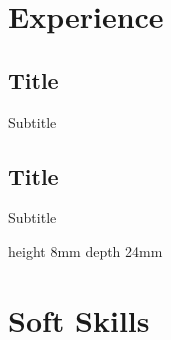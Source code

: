 \documentclass{CVClass}
\begin{document}
\begin{minipage}[t]{0.60\textwidth}
    \section{Experience}
    \subsection[2019-2019]{Title}{Subtitle}{
        \lipsum[1][1-5]
    }
    \vskip2mm
    \subsection[2019-2019]{Title}{Subtitle}{
        \lipsum[1][1-5]
    }
\end{minipage}
\quad
\vline height 8mm depth 24mm 
\quad
\begin{minipage}[t]{0.40\textwidth}
    \section{Soft Skills}
\end{minipage}
\end{document}
